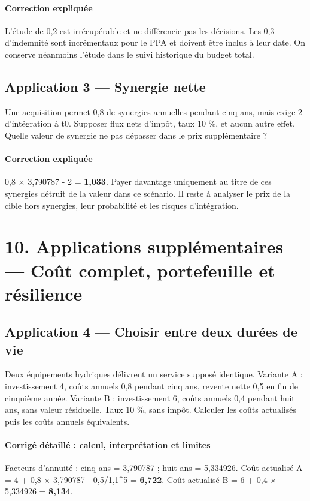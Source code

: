 \documentclass[12pt,a4paper]{article}
\begin{document}
\paragraph{Correction expliquée}
L’étude de 0,2 est irrécupérable et ne différencie pas les décisions. Les 0,3 d’indemnité sont incrémentaux pour le PPA et doivent être inclus à leur date. On conserve néanmoins l’étude dans le suivi historique du budget total.



\subsection*{Application 3 --- Synergie nette}
Une acquisition permet 0,8 de synergies annuelles pendant cinq ans, mais exige 2 d’intégration à t0. Supposer flux nets d’impôt, taux 10 \%, et aucun autre effet. Quelle valeur de synergie ne pas dépasser dans le prix supplémentaire ?


\paragraph{Correction expliquée}
0,8 $\times$ 3,790787 - 2 = \textbf{1,033}. Payer davantage uniquement au titre de ces synergies détruit de la valeur dans ce scénario. Il reste à analyser le prix de la cible hors synergies, leur probabilité et les risques d’intégration.

\section*{10. Applications supplémentaires --- Coût complet, portefeuille et résilience}

\subsection*{Application 4 --- Choisir entre deux durées de vie}
Deux équipements hydriques délivrent un service supposé identique. Variante A : investissement 4, coûts annuels 0,8 pendant cinq ans, revente nette 0,5 en fin de cinquième année. Variante B : investissement 6, coûts annuels 0,4 pendant huit ans, sans valeur résiduelle. Taux 10 \%, sans impôt. Calculer les coûts actualisés puis les coûts annuels équivalents.


\paragraph{Corrigé détaillé : calcul, interprétation et limites}
Facteurs d’annuité : cinq ans = 3,790787 ; huit ans = 5,334926. Coût actualisé A = 4 + 0,8 $\times$ 3,790787 - 0,5/1,1\textasciicircum{}5 = \textbf{6,722}. Coût actualisé B = 6 + 0,4 $\times$ 5,334926 = \textbf{8,134}.
\end{document}
